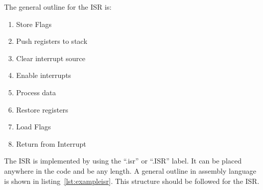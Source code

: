 The general outline for the ISR is:
\begin{enumerate}
\item Store Flags
\item Push registers to stack
\item Clear interrupt source
\item Enable interrupts
\item Process data
\item Restore registers
\item Load Flags
\item Return from Interrupt
\end{enumerate}

The ISR is implemented by using the ``.isr'' or ``.ISR'' label. 
It can be placed anywhere in the code and be any length.
A general outline in assembly language is shown in listing~\ref{lst:exampleisr}. 
This structure should be followed for the ISR.






